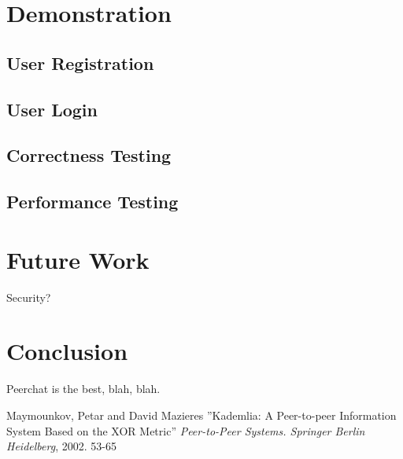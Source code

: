 \documentclass{article}
\begin{document}
\section{Demonstration}

\subsection{User Registration}
\subsection{User Login}
\subsection{Correctness Testing}
\subsection{Performance Testing}

\section{Future Work}

Security?

\section{Conclusion}

Peerchat is the best, blah, blah.

\begin{thebibliography}{99}
   Maymounkov, Petar and David Mazieres
   ''Kademlia: A Peer-to-peer Information System Based on the XOR Metric''
   \textit{Peer-to-Peer Systems. Springer Berlin Heidelberg}, 2002. 53-65
 
\end{thebibliography}
\end{document}
